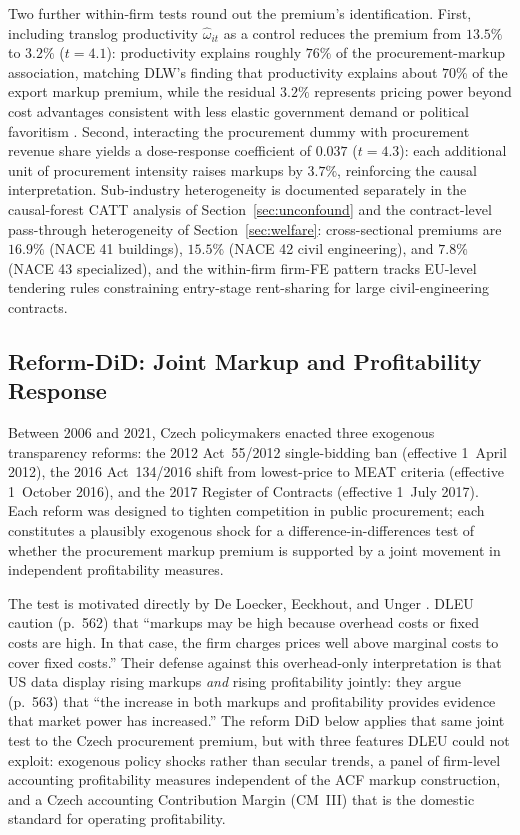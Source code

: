 \documentclass[11pt]{article}
\begin{document}
Two further within-firm tests round out the premium's identification. First, including translog productivity $\hat\omega_{it}$ as a control reduces the premium from $13.5\%$ to $3.2\%$ ($t = 4.1$): productivity explains roughly $76\%$ of the procurement-markup association, matching DLW's finding that productivity explains about $70\%$ of the export markup premium, while the residual $3.2\%$ represents pricing power beyond cost advantages consistent with less elastic government demand or political favoritism \cite{BaranekTitl2024}. Second, interacting the procurement dummy with procurement revenue share yields a dose-response coefficient of $0.037$ ($t = 4.3$): each additional unit of procurement intensity raises markups by $3.7\%$, reinforcing the causal interpretation. Sub-industry heterogeneity is documented separately in the causal-forest CATT analysis of Section~\ref{sec:unconfound} and the contract-level pass-through heterogeneity of Section~\ref{sec:welfare}: cross-sectional premiums are $16.9\%$ (NACE 41 buildings), $15.5\%$ (NACE 42 civil engineering), and $7.8\%$ (NACE 43 specialized), and the within-firm firm-FE pattern tracks EU-level tendering rules constraining entry-stage rent-sharing for large civil-engineering contracts.

\subsection{Reform-DiD: Joint Markup and Profitability Response}\label{sec:policy}

Between 2006 and 2021, Czech policymakers enacted three exogenous transparency reforms: the 2012 Act~55/2012 single-bidding ban (effective 1~April 2012), the 2016 Act~134/2016 shift from lowest-price to MEAT criteria (effective 1~October 2016), and the 2017 Register of Contracts (effective 1~July 2017). Each reform was designed to tighten competition in public procurement; each constitutes a plausibly exogenous shock for a difference-in-differences test of whether the procurement markup premium is supported by a joint movement in independent profitability measures.

The test is motivated directly by De Loecker, Eeckhout, and Unger \cite{DLEU2020}. DLEU caution (p.~562) that ``markups may be high because overhead costs or fixed costs are high. In that case, the firm charges prices well above marginal costs to cover fixed costs.'' Their defense against this overhead-only interpretation is that US data display rising markups \emph{and} rising profitability jointly: they argue (p.~563) that ``the increase in both markups and profitability provides evidence that market power has increased.'' The reform DiD below applies that same joint test to the Czech procurement premium, but with three features DLEU could not exploit: exogenous policy shocks rather than secular trends, a panel of firm-level accounting profitability measures independent of the ACF markup construction, and a Czech accounting Contribution Margin (CM~III) that is the domestic standard for operating profitability.
\end{document}

